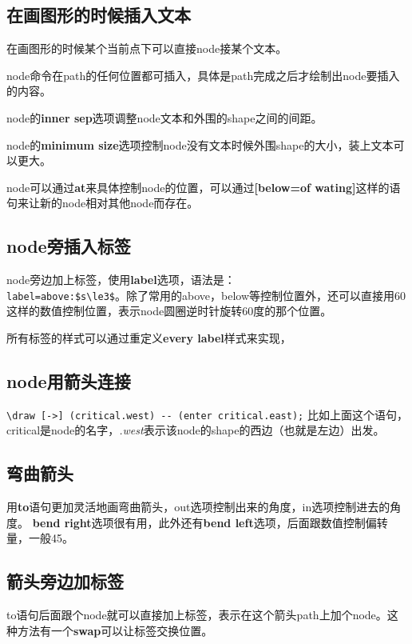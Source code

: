 \documentclass[11pt,oneside]{book}
\begin{document}
\begin{common-format}
\subsection{在画图形的时候插入文本}

在画图形的时候某个当前点下可以直接node接某个文本。

node命令在path的任何位置都可插入，具体是path完成之后才绘制出node要插入的内容。

node的\textbf{inner sep}选项调整node文本和外围的shape之间的间距。

node的\textbf{minimum size}选项控制node没有文本时候外围shape的大小，装上文本可以更大。

node可以通过\textbf{at}来具体控制node的位置，可以通过\textbf{[below=of wating]}这样的语句来让新的node相对其他node而存在。


\subsection{node旁插入标签}
node旁边加上标签，使用\textbf{label}选项，语法是：\\
\verb+label=above:$s\le3$+。除了常用的above，below等控制位置外，还可以直接用60这样的数值控制位置，表示node圆圈逆时针旋转60度的那个位置。

所有标签的样式可以通过重定义\textbf{every label}样式来实现，


\subsection{node用箭头连接}
\verb+\draw [->] (critical.west) -- (enter critical.east);+
比如上面这个语句，critical是node的名字，\emph{.west}表示该node的shape的西边（也就是左边）出发。

\subsection{弯曲箭头}
用\textbf{to}语句更加灵活地画弯曲箭头，out选项控制出来的角度，in选项控制进去的角度。
\textbf{bend right}选项很有用，此外还有\textbf{bend left}选项，后面跟数值控制偏转量，一般45。

\subsection{箭头旁边加标签}
to语句后面跟个node就可以直接加上标签，表示在这个箭头path上加个node。这种方法有一个\textbf{swap}可以让标签交换位置。



\end{common-format}
\end{document}
